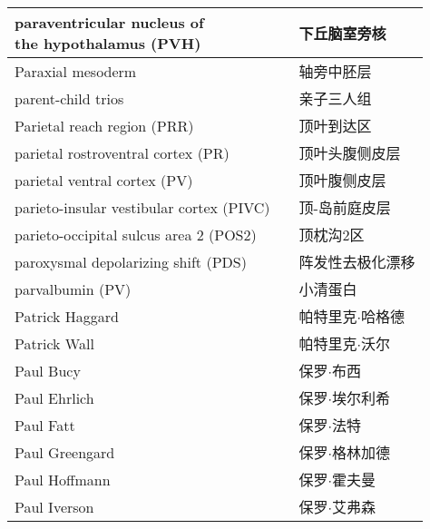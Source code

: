 \begin{longtable}{lll}
	\midrule
	\makecell[l]{paraventricular nucleus of\\ the hypothalamus (PVH)}    && 下丘脑室旁核   \\
	
	\midrule
	Paraxial mesoderm     && 轴旁中胚层   \\
	
	\midrule
	parent-child trios     && 亲子三人组   \\
	
	\midrule
	Parietal reach region (PRR)     && 顶叶到达区   \\
	
	\midrule
	parietal rostroventral cortex (PR)     && 顶叶头腹侧皮层   \\
	
	\midrule
	parietal ventral cortex (PV)     && 顶叶腹侧皮层   \\
	
	\midrule
	parieto-insular vestibular cortex (PIVC)     && 顶-岛前庭皮层   \\
	
	\midrule
	parieto-occipital sulcus area 2  (POS2)   && 顶枕沟2区   \\
	
	\midrule
	paroxysmal depolarizing shift (PDS)     && 阵发性去极化漂移   \\
	
	\midrule
	parvalbumin  (PV)   && 小清蛋白   \\
	
	\midrule
	Patrick Haggard     && 帕特里克$\cdot$哈格德   \\
	
	\midrule
	Patrick Wall     && 帕特里克$\cdot$沃尔   \\
	
	\midrule
	Paul Bucy     && 保罗$\cdot$布西  \\
	
	\midrule
	Paul Ehrlich     && 保罗$\cdot$埃尔利希  \\
	
	\midrule
	Paul Fatt     && 保罗$\cdot$法特  \\
	
	\midrule
	Paul Greengard     && 保罗$\cdot$格林加德  \\
	
	\midrule
	Paul Hoffmann     && 保罗$\cdot$霍夫曼  \\
	
	\midrule
	Paul Iverson     && 保罗$\cdot$艾弗森  \\
	

\end{longtable}
